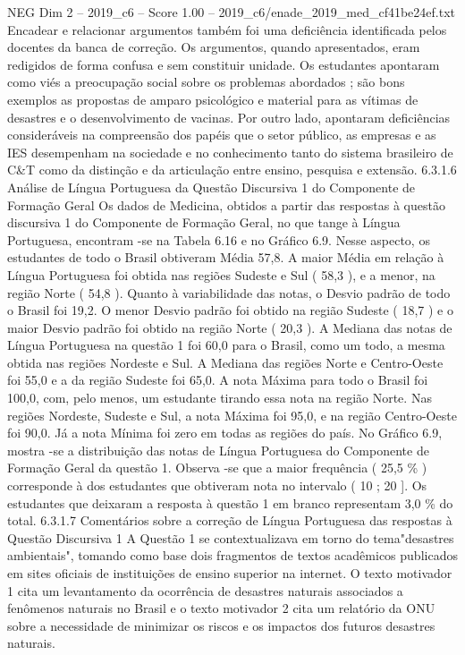 \begin{textsample}{NEG Dim 2 – 2019\_c6 – Score 1.00 – 2019\_c6/enade\_2019\_med\_cf41be24ef.txt}
Encadear e relacionar argumentos também foi uma deficiência identificada pelos docentes da banca de correção.
Os argumentos, quando apresentados, eram redigidos de forma confusa e sem constituir unidade.
Os estudantes apontaram como viés a preocupação social sobre os problemas abordados ; são bons exemplos as propostas de amparo psicológico e material para as vítimas de desastres e o desenvolvimento de vacinas.
Por outro lado, apontaram deficiências consideráveis na compreensão dos papéis que o setor público, as empresas e as IES desempenham na sociedade e no conhecimento tanto do sistema brasileiro de C\&T como da distinção e da articulação entre ensino, pesquisa e extensão. 6.3.1.6 Análise de Língua Portuguesa da Questão Discursiva 1 do Componente de Formação Geral Os dados de Medicina, obtidos a partir das respostas à questão discursiva 1 do Componente de Formação Geral, no que tange à Língua Portuguesa, encontram -se na Tabela 6.16 e no Gráfico 6.9.
Nesse aspecto, os estudantes de todo o Brasil obtiveram Média 57,8.
A maior Média em relação à Língua Portuguesa foi obtida nas regiões Sudeste e Sul ( 58,3 ), e a menor, na região Norte ( 54,8 ).
Quanto à variabilidade das notas, o Desvio padrão de todo o Brasil foi 19,2.
O menor Desvio padrão foi obtido na região Sudeste ( 18,7 ) e o maior Desvio padrão foi obtido na região Norte ( 20,3 ).
A Mediana das notas de Língua Portuguesa na questão 1 foi 60,0 para o Brasil, como um todo, a mesma obtida nas regiões Nordeste e Sul.
A Mediana das regiões Norte e Centro-Oeste foi 55,0 e a da região Sudeste foi 65,0.
A nota Máxima para todo o Brasil foi 100,0, com, pelo menos, um estudante tirando essa nota na região Norte.
Nas regiões Nordeste, Sudeste e Sul, a nota Máxima foi 95,0, e na região Centro-Oeste foi 90,0.
Já a nota Mínima foi zero em todas as regiões do país.
No Gráfico 6.9, mostra -se a distribuição das notas de Língua Portuguesa do Componente de Formação Geral da questão 1.
Observa -se que a maior frequência ( 25,5 \% ) corresponde à dos estudantes que obtiveram nota no intervalo ( 10 ; 20 ].
Os estudantes que deixaram a resposta à questão 1 em branco representam 3,0 \% do total. 6.3.1.7 Comentários sobre a correção de Língua Portuguesa das respostas à Questão Discursiva 1 A Questão 1 se contextualizava em torno do tema"desastres ambientais", tomando como base dois fragmentos de textos acadêmicos publicados em sites oficiais de instituições de ensino superior na internet.
O texto motivador 1 cita um levantamento da ocorrência de desastres naturais associados a fenômenos naturais no Brasil e o texto motivador 2 cita um relatório da ONU sobre a necessidade de minimizar os riscos e os impactos dos futuros desastres naturais.

\end{textsample}
